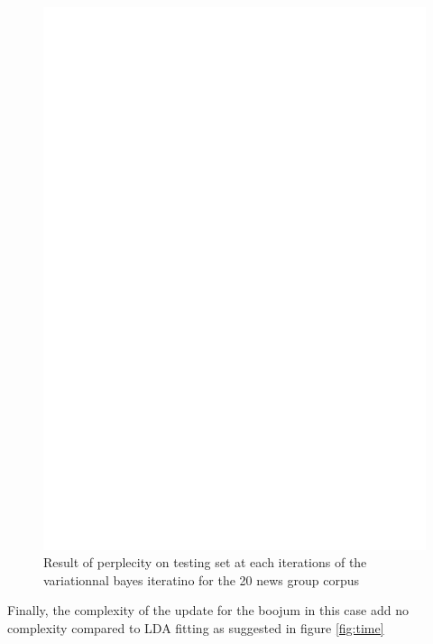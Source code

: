 \begin{figure}[h]
\label{fig:pp_conv}
\includegraphics[scale=0.4]{results/pp_conv.eps}
\caption{Result of perplecity on testing set at each iterations of the variationnal bayes iteratino for the 20 news group corpus}
\end{figure}

Finally, the complexity of the update for the boojum in this case add no complexity compared to LDA fitting as suggested in figure \ref{fig:time}

